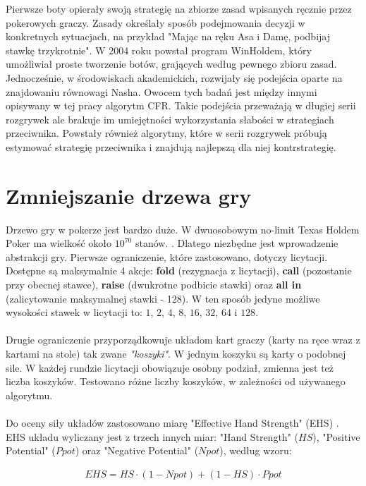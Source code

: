 \documentclass[licencjacka]{pracamgr}
\begin{document}
Pierwsze boty opierały swoją strategię na zbiorze zasad wpisanych ręcznie przez pokerowych graczy. Zasady określały
sposób podejmowania decyzji w konkretnych sytuacjach, na przykład "Mając na ręku Asa i Damę, podbijaj stawkę trzykrotnie".
W 2004 roku powstał program WinHoldem, który umożliwiał proste tworzenie botów, grających według pewnego zbioru zasad.
Jednocześnie, w środowiskach akademickich, rozwijały się podejścia oparte na znajdowaniu równowagi Nasha. Owocem tych
badań jest między innymi opisywany w tej pracy algorytm CFR. Takie podejścia przeważają w długiej serii rozgrywek ale
brakuje im umiejętności wykorzystania słabości w strategiach przeciwnika. Powstały również algorytmy, które w serii
rozgrywek próbują estymować strategię przeciwnika i znajdują najlepszą dla niej kontrstrategię. \cite{exploit}

\section{Zmniejszanie drzewa gry}

Drzewo gry w pokerze jest bardzo duże. W dwuosobowym no-limit Texas Holdem Poker ma wielkość
około $10^{70}$ stanów. \cite{monte-carlo}. Dlatego niezbędne jest wprowadzenie abstrakcji gry.
Pierwsze ograniczenie, które zastosowano, dotyczy licytacji. Dostępne są maksymalnie 4 akcje:
\textbf{fold} (rezygnacja z licytacji), \textbf{call} (pozostanie przy obecnej stawce), \textbf{raise} (dwukrotne podbicie stawki) oraz
\textbf{all in} (zalicytowanie maksymalnej stawki - 128). W ten sposób jedyne możliwe wysokości stawek w licytacji to: $1$, $2$,
$4$, $8$, $16$, $32$, $64$ i $128$. \\\\
\noindent
Drugie ograniczenie przyporządkowuje układom kart graczy (karty na ręce wraz z kartami na stole) tak zwane \emph{"koszyki"}. \cite[sekcja 4.4]{buckets}
W jednym koszyku są karty o podobnej sile. W każdej rundzie licytacji obowiązuje osobny podział, zmienna
jest też liczba koszyków. Testowano różne liczby koszyków, w zależności od używanego algorytmu. \\\\
\noindent
Do oceny siły układów zastosowano miarę "Effective Hand Strength" (EHS) \cite{ehs}. EHS układu wyliczany
jest z trzech innych miar: "Hand Strength" ($HS$), "Positive Potential" ($Ppot$) oraz "Negative Potential" ($Npot$), według
wzoru:

\begin{align*}
EHS = HS \cdot (1 - Npot) + (1 - HS) \cdot Ppot
\end{align*}
\end{document}
